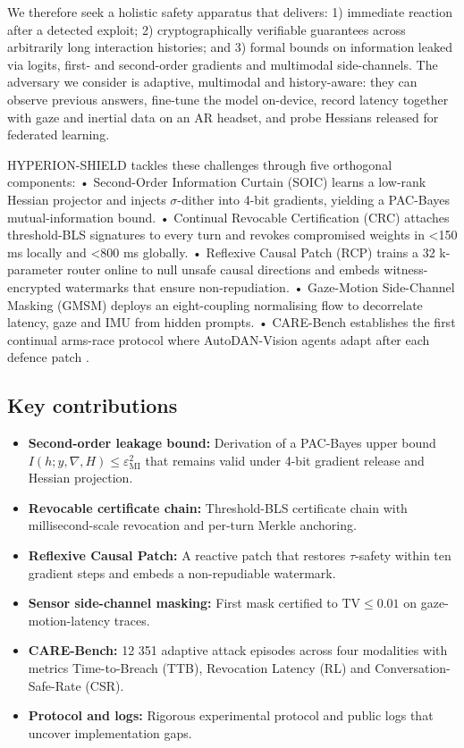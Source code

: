 \documentclass{article}
\begin{document}
We therefore seek a holistic safety apparatus that delivers: 1) immediate reaction after a detected exploit; 2) cryptographically verifiable guarantees across arbitrarily long interaction histories; and 3) formal bounds on information leaked via logits, first- and second-order gradients and multimodal side-channels. The adversary we consider is adaptive, multimodal and history-aware: they can observe previous answers, fine-tune the model on-device, record latency together with gaze and inertial data on an AR headset, and probe Hessians released for federated learning.

HYPERION-SHIELD tackles these challenges through five orthogonal components: • Second-Order Information Curtain (SOIC) learns a low-rank Hessian projector and injects $\sigma$-dither into 4-bit gradients, yielding a PAC-Bayes mutual-information bound. • Continual Revocable Certification (CRC) attaches threshold-BLS signatures to every turn and revokes compromised weights in <150 ms locally and <800 ms globally. • Reflexive Causal Patch (RCP) trains a 32 k-parameter router online to null unsafe causal directions and embeds witness-encrypted watermarks that ensure non-repudiation. • Gaze-Motion Side-Channel Masking (GMSM) deploys an eight-coupling normalising flow to decorrelate latency, gaze and IMU from hidden prompts. • CARE-Bench establishes the first continual arms-race protocol where AutoDAN-Vision agents adapt after each defence patch \cite{liu-2023-autodan}.

\subsection{Key contributions}
\begin{itemize}
  \item \textbf{Second-order leakage bound:} Derivation of a PAC-Bayes upper bound $I(h; y,\nabla,H) \leq \varepsilon_{\mathrm{MI}}^{2}$ that remains valid under 4-bit gradient release and Hessian projection.
  \item \textbf{Revocable certificate chain:} Threshold-BLS certificate chain with millisecond-scale revocation and per-turn Merkle anchoring.
  \item \textbf{Reflexive Causal Patch:} A reactive patch that restores $\tau$-safety within ten gradient steps and embeds a non-repudiable watermark.
  \item \textbf{Sensor side-channel masking:} First mask certified to $\mathrm{TV} \leq 0.01$ on gaze-motion-latency traces.
  \item \textbf{CARE-Bench:} 12 351 adaptive attack episodes across four modalities with metrics Time-to-Breach (TTB), Revocation Latency (RL) and Conversation-Safe-Rate (CSR).
  \item \textbf{Protocol and logs:} Rigorous experimental protocol and public logs that uncover implementation gaps.
\end{itemize}
\end{document}
